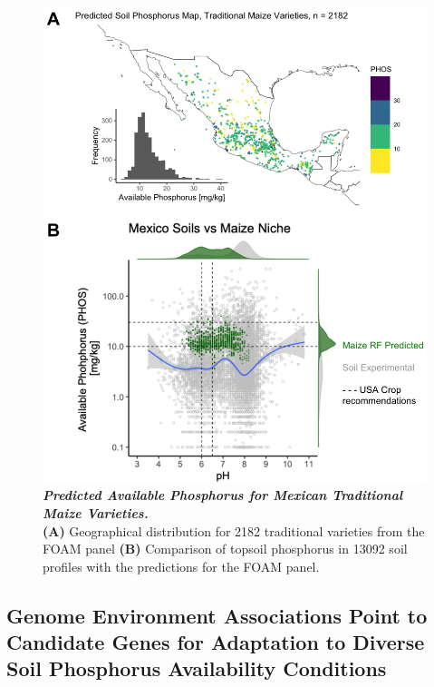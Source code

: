 \begin{figure}[!ht]
\centering
\includegraphics[width=\linewidth]{Chapter-2/figs/predicted_PHOS.png}
\caption[Predicted Available Phosphorus for Mexican Traditional Maize Varieties]{\textit{\textbf{Predicted Available Phosphorus for Mexican Traditional Maize Varieties.}}
\\\hspace{\textwidth}
\textbf{(A)} Geographical distribution for 2182 traditional varieties from the FOAM panel \citep{romero_navarro2017-cn}
\textbf{(B)} Comparison of topsoil phosphorus in 13092 soil profiles \citep{paz-pellat2018} with the predictions for the FOAM panel.}
\label{fig::pointpred}
\end{figure}
\clearpage

\subsection{Genome Environment Associations Point to Candidate Genes for Adaptation to Diverse Soil Phosphorus Availability Conditions}

